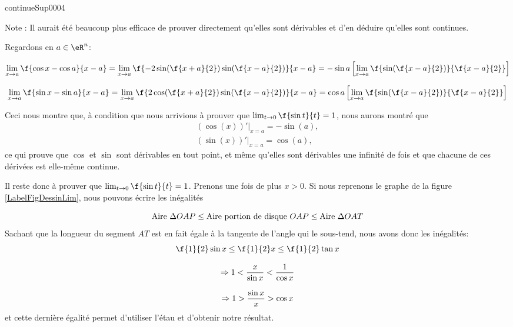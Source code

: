 \begin{corrige}{continueSup0004}
\begin{enumerate}
Note : Il aurait été beaucoup plus efficace  de prouver directement qu'elles sont dérivables et d'en déduire qu'elles sont continues.

Regardons en $a\in \eR^n$: 

\[\lim_{x\rightarrow  a}\f{ \cos x  - \cos a}{x-a} = \lim_{x\rightarrow  a}\f{ -2\sin(\f{x+a}{2})\sin(\f{x-a}{2})}{x-a}\\
= -\sin a \left[  \lim_{x\rightarrow  a}\f{ \sin(\f{x-a}{2})}{\f{x-a}{2}}\right]\]


\[\lim_{x\rightarrow  a}\f{ \sin x  - \sin a}{x-a} = \lim_{x\rightarrow  a}\f{ 2\cos(\f{x+a}{2})\sin(\f{x-a}{2})}{x-a}\\
= \cos a \left[  \lim_{x\rightarrow  a}\f{ \sin(\f{x-a}{2})}{\f{x-a}{2}}\right]\]

Ceci nous montre que, à condition que nous arrivions à prouver que $\lim_{t\rightarrow  0} \f{\sin t}{t}=1$, nous aurons montré que 
\[
    \begin{array}{l} (\cos(x))'|_{x=a} = -\sin(a), \\ (\sin(x))'|_{x=a} = \cos(a),\end{array}
\]
 ce qui prouve que $\cos$ et $\sin$ sont dérivables en tout point, et même qu'elles sont dérivables une infinité de fois et que chacune de ces dérivées est elle-même continue. 

Il reste donc à prouver que $\lim_{t\rightarrow  0} \f{\sin t}{t}=1$. Prenons une fois de plus $x>0$. Si nous reprenons le graphe de la figure \ref{LabelFigDessinLim}, nous pouvons écrire les inégalités

\[ {\rm Aire \ }\Delta  OAP \leq {\rm Aire \  portion \  de \  disque \ } OAP \leq {\rm Aire \ }\Delta  OAT\] Sachant que la longueur du segment $AT$ est en fait égale à la tangente de l'angle qui le sous-tend, nous avons donc les inégalités:
\[\begin{array}{c} \f{1}{2}\sin x \leq \f{1}{2} x\leq\f{1}{2} \tan x\\ \\
	  \Rightarrow 1 < \dfrac{x}{\sin x} < \dfrac{1}{\cos x} \\\\
  \Rightarrow 1 > \dfrac{\sin x}{x} > \cos x\end{array}\]
	  et cette dernière égalité permet d'utiliser l'étau et d'obtenir notre résultat.	
	  
 \end{enumerate}

\end{corrige}
